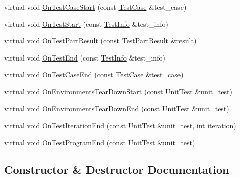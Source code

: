 \begin{DoxyCompactItemize}
\item 
virtual void \mbox{\hyperlink{classtesting_1_1internal_1_1TestEventRepeater_a70124c738caa338bcd723eb2a51c8b3e}{On\+Test\+Case\+Start}} (const \mbox{\hyperlink{classtesting_1_1TestCase}{Test\+Case}} \&test\+\_\+case)
\item 
virtual void \mbox{\hyperlink{classtesting_1_1internal_1_1TestEventRepeater_a70d694ca5010cc86cd458f7f529e6fbe}{On\+Test\+Start}} (const \mbox{\hyperlink{classtesting_1_1TestInfo}{Test\+Info}} \&test\+\_\+info)
\item 
virtual void \mbox{\hyperlink{classtesting_1_1internal_1_1TestEventRepeater_ac8fb21da6802b1ebab9cad3eee9150eb}{On\+Test\+Part\+Result}} (const Test\+Part\+Result \&result)
\item 
virtual void \mbox{\hyperlink{classtesting_1_1internal_1_1TestEventRepeater_aa0f13bded9369aae1c78583d7276f8b1}{On\+Test\+End}} (const \mbox{\hyperlink{classtesting_1_1TestInfo}{Test\+Info}} \&test\+\_\+info)
\item 
virtual void \mbox{\hyperlink{classtesting_1_1internal_1_1TestEventRepeater_a0a335e1c3957a8c699ed56e37ea7b978}{On\+Test\+Case\+End}} (const \mbox{\hyperlink{classtesting_1_1TestCase}{Test\+Case}} \&test\+\_\+case)
\item 
virtual void \mbox{\hyperlink{classtesting_1_1internal_1_1TestEventRepeater_a30db75df2d9a65d787f31e16004613c2}{On\+Environments\+Tear\+Down\+Start}} (const \mbox{\hyperlink{classtesting_1_1UnitTest}{Unit\+Test}} \&unit\+\_\+test)
\item 
virtual void \mbox{\hyperlink{classtesting_1_1internal_1_1TestEventRepeater_a8428220c4cf9f0cea2dfd9a70f07ab7f}{On\+Environments\+Tear\+Down\+End}} (const \mbox{\hyperlink{classtesting_1_1UnitTest}{Unit\+Test}} \&unit\+\_\+test)
\item 
virtual void \mbox{\hyperlink{classtesting_1_1internal_1_1TestEventRepeater_a94253e3c11753328e8a031f39352708f}{On\+Test\+Iteration\+End}} (const \mbox{\hyperlink{classtesting_1_1UnitTest}{Unit\+Test}} \&unit\+\_\+test, int iteration)
\item 
virtual void \mbox{\hyperlink{classtesting_1_1internal_1_1TestEventRepeater_a4622616259747dbcc23f5ee39ef99ec0}{On\+Test\+Program\+End}} (const \mbox{\hyperlink{classtesting_1_1UnitTest}{Unit\+Test}} \&unit\+\_\+test)
\end{DoxyCompactItemize}


\subsection{Constructor \& Destructor Documentation}
\mbox{\label{classtesting_1_1internal_1_1TestEventRepeater_a97dc3b08bd62c615f16e4c73ed0b3894}} 
